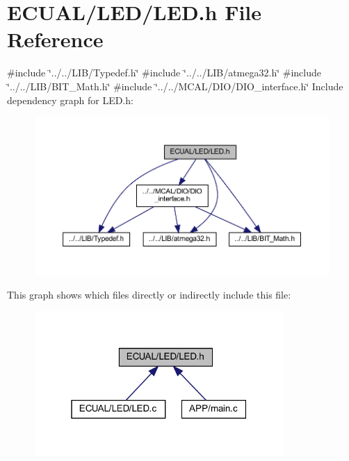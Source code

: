 \section{E\+C\+U\+A\+L/\+L\+E\+D/\+L\+ED.h File Reference}
\label{_l_e_d_8h}
{\ttfamily \#include \char`\"{}../../\+L\+I\+B/\+Typedef.\+h\char`\"{}}\newline
{\ttfamily \#include \char`\"{}../../\+L\+I\+B/atmega32.\+h\char`\"{}}\newline
{\ttfamily \#include \char`\"{}../../\+L\+I\+B/\+B\+I\+T\+\_\+\+Math.\+h\char`\"{}}\newline
{\ttfamily \#include \char`\"{}../../\+M\+C\+A\+L/\+D\+I\+O/\+D\+I\+O\+\_\+interface.\+h\char`\"{}}\newline
Include dependency graph for L\+E\+D.\+h\+:
\nopagebreak
\begin{figure}[H]
\begin{center}
\leavevmode
\includegraphics[width=350pt]{_l_e_d_8h__incl}
\end{center}
\end{figure}
This graph shows which files directly or indirectly include this file\+:
\nopagebreak
\begin{figure}[H]
\begin{center}
\leavevmode
\includegraphics[width=268pt]{_l_e_d_8h__dep__incl}
\end{center}
\end{figure}
